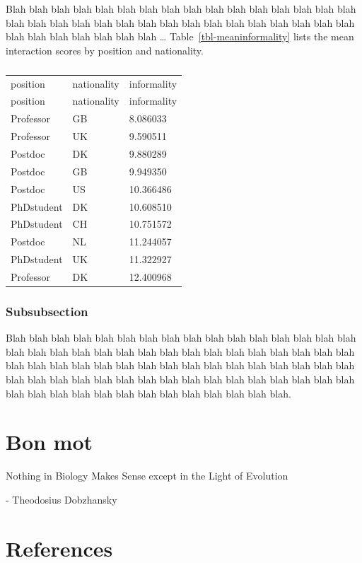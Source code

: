 \documentclass[
  a4paper,
]{scrbook}
\renewenvironment{quote}{\begin{myquote}}{\end{myquote}}
\begin{document}
Blah blah blah blah blah blah blah blah blah blah blah blah blah blah
blah blah blah blah blah blah blah blah blah blah blah blah blah blah
blah blah blah blah blah blah blah blah blah blah blah \ldots{}
Table~\ref{tbl-meaninformality} lists the mean interaction scores by
position and nationality.

\begin{longtable}[]{@{}lll@{}}

\caption{\label{tbl-meaninformality}Mean interaction scores by position
and nationality.}

\tabularnewline

\caption{}\label{T_42276}\tabularnewline
\toprule\noalign{}
position & nationality & informality \\
\midrule\noalign{}
\endfirsthead
\toprule\noalign{}
position & nationality & informality \\
\midrule\noalign{}
\endhead
\bottomrule\noalign{}
\endlastfoot
Professor & GB & 8.086033 \\
Professor & UK & 9.590511 \\
Postdoc & DK & 9.880289 \\
Postdoc & GB & 9.949350 \\
Postdoc & US & 10.366486 \\
PhDstudent & DK & 10.608510 \\
PhDstudent & CH & 10.751572 \\
Postdoc & NL & 11.244057 \\
PhDstudent & UK & 11.322927 \\
Professor & DK & 12.400968 \\

\end{longtable}

\subsection{Subsubsection}\label{subsubsection}

Blah blah blah blah blah blah blah blah blah blah blah blah blah blah
blah blah blah blah blah blah blah blah blah blah blah blah blah blah
blah blah blah blah blah blah blah blah blah blah blah blah blah blah
blah blah blah blah blah blah blah blah blah blah blah blah blah blah
blah blah blah blah blah blah blah blah blah blah blah blah blah blah
blah blah blah blah blah blah blah.

\chapter{Bon mot}\label{bon-mot}

\begin{quote}
Nothing in Biology Makes Sense except in the Light of Evolution

- Theodosius Dobzhansky
\end{quote}

\chapter{References}\label{references}


\backmatter
\end{document}
